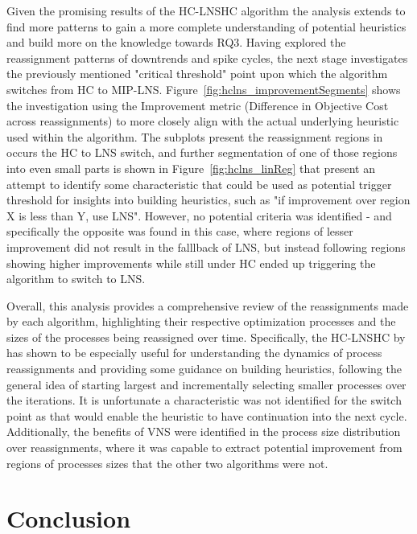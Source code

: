 \documentclass[a4paper,12pt]{Classes/RoboticsLaTeX}
\begin{document}
Given the promising results of the HC-LNSHC algorithm the analysis extends to find more patterns to gain a more complete understanding of potential heuristics and build more on the knowledge towards RQ3. Having explored the reassignment patterns of downtrends and spike cycles, the next stage investigates the previously mentioned "critical threshold" point upon which the algorithm switches from HC to MIP-LNS. Figure~\ref{fig:hclns_improvementSegments} shows the investigation using the Improvement metric (Difference in Objective Cost across reassignments) to more closely align with the actual underlying heuristic used within the algorithm. The subplots present the reassignment regions in occurs the HC to LNS switch, and further segmentation of one of those regions into even small parts is shown in Figure~\ref{fig:hclns_linReg} that present an attempt to identify some characteristic that could be used as potential trigger threshold for insights into building heuristics, such as "if improvement over region X is less than Y, use LNS". However, no potential criteria was identified - and specifically the opposite was found in this case, where regions of lesser improvement did not result in the falllback of LNS, but instead following regions showing higher improvements while still under HC ended up triggering the algorithm to switch to LNS.

Overall, this analysis provides a comprehensive review of the reassignments made by each algorithm, highlighting their respective optimization processes and the sizes of the processes being reassigned over time. Specifically, the HC-LNSHC by \cite{jaskowski2016} has shown to be especially useful for understanding the dynamics of process reassignments and providing some guidance on building heuristics, following the general idea of starting largest and incrementally selecting smaller processes over the iterations. It is unfortunate a characteristic was not identified for the switch point as that would enable the heuristic to have continuation into the next cycle. Additionally, the benefits of VNS were identified in the process size distribution over reassignments, where it was capable to extract potential improvement from regions of processes sizes that the other two algorithms were not.


\chapter{Conclusion} \label{chap:conclusion}
\end{document}
